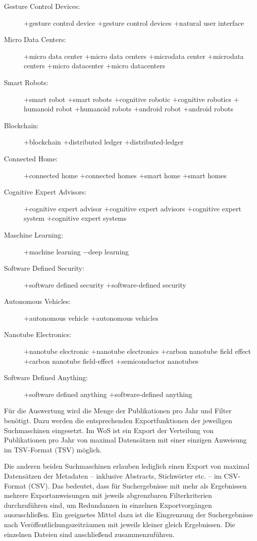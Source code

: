 \begin{description}
	\item[Gesture Control Devices:] $+$gesture control device $+$gesture control devices $+$natural user interface
	\item[Micro Data Centers:] $+$micro data center $+$micro data centers $+$microdata center $+$microdata centers $+$micro datacenter $+$micro datacenters
	\item[Smart Robots:] $+$smart robot $+$smart robots $+$cognitive robotic $+$cognitive robotics $+$humanoid robot  $+$humanoid robots $+$android robot $+$android robots
	\item[Blockchain:] $+$blockchain $+$distributed ledger $+$distributed-ledger
	\item[Connected Home:] $+$connected home $+$connected homes $+$smart home $+$smart homes
	\item[Cognitive Expert Advisors:] $+$cognitive expert advisor $+$cognitive expert advisors $+$cognitive expert system $+$cognitive expert systems
	\item[Maschine Learning:] $+$machine learning $-$deep learning
	\item[Software Defined Security:] $+$software defined security $+$software-defined security
	\item[Autonomous Vehicles:] $+$autonomous vehicle $+$autonomous vehicles
	\item[Nanotube Electronics:] $+$nanotube electronic $+$nanotube electronics $+$carbon nanotube field effect $+$carbon nanotube field-effect $+$semiconductor nanotubes
	\item[Software Defined Anything:] $+$software defined anything $+$software-defined anything
\end{description}

Für die Auswertung wird die Menge der Publikationen pro Jahr und Filter benötigt. Dazu werden die entsprechenden Exportfunktionen der jeweiligen Suchmaschinen eingesetzt. Im \ac{WoS} ist ein Export der Verteilung von Publikationen pro Jahr von maximal  Datensätzen mit einer einzigen Anweisung im \acs{TSV}-Format (\acl{TSV}) möglich.

Die anderen beiden Suchmaschinen erlauben lediglich einen Export von maximal  Datensätzen der Metadaten -- inklusive Abstracts, Stichwörter etc. -- im \acs{CSV}-Format (\acl{CSV}). Das bedeutet, dass für Suchergebnisse mit mehr als  Ergebnissen mehrere Exportanweisungen mit jeweils abgrenzbaren Filterkriterien durchzuführen sind, um Redundanzen in einzelnen Exportvorgängen auszuschließen. Ein geeignetes Mittel dazu ist die Eingrenzung der Suchergebnisse nach Veröffentlichungs\-zeiträumen mit jeweils kleiner gleich  Ergebnissen. Die einzelnen Dateien sind anschließend zusammenzuführen.

